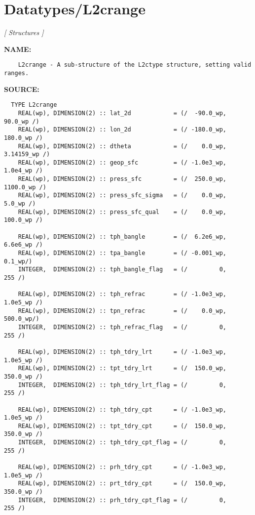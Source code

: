 \section{Datatypes/L2crange}
\textsl{[ Structures ]}

\label{ch:robo44}
\label{ch:Datatypes_L2crange}
\textbf{NAME:}\hspace{0.08in}\begin{Verbatim}
    L2crange - A sub-structure of the L2ctype structure, setting valid ranges.
\end{Verbatim}
\textbf{SOURCE:}\hspace{0.08in}\begin{Verbatim}
  TYPE L2crange
    REAL(wp), DIMENSION(2) :: lat_2d            = (/  -90.0_wp,     90.0_wp /)
    REAL(wp), DIMENSION(2) :: lon_2d            = (/ -180.0_wp,    180.0_wp /)
    REAL(wp), DIMENSION(2) :: dtheta            = (/    0.0_wp,  3.14159_wp /)
    REAL(wp), DIMENSION(2) :: geop_sfc          = (/ -1.0e3_wp,    1.0e4_wp /)
    REAL(wp), DIMENSION(2) :: press_sfc         = (/  250.0_wp,   1100.0_wp /)
    REAL(wp), DIMENSION(2) :: press_sfc_sigma   = (/    0.0_wp,      5.0_wp /)
    REAL(wp), DIMENSION(2) :: press_sfc_qual    = (/    0.0_wp,    100.0_wp /)

    REAL(wp), DIMENSION(2) :: tph_bangle        = (/  6.2e6_wp,  6.6e6_wp /)
    REAL(wp), DIMENSION(2) :: tpa_bangle        = (/ -0.001_wp,     0.1_wp/)
    INTEGER,  DIMENSION(2) :: tph_bangle_flag   = (/         0,       255 /)

    REAL(wp), DIMENSION(2) :: tph_refrac        = (/ -1.0e3_wp,  1.0e5_wp /)
    REAL(wp), DIMENSION(2) :: tpn_refrac        = (/    0.0_wp,   500.0_wp/)
    INTEGER,  DIMENSION(2) :: tph_refrac_flag   = (/         0,       255 /)

    REAL(wp), DIMENSION(2) :: tph_tdry_lrt      = (/ -1.0e3_wp,  1.0e5_wp /)
    REAL(wp), DIMENSION(2) :: tpt_tdry_lrt      = (/  150.0_wp,  350.0_wp /)
    INTEGER,  DIMENSION(2) :: tph_tdry_lrt_flag = (/         0,       255 /)

    REAL(wp), DIMENSION(2) :: tph_tdry_cpt      = (/ -1.0e3_wp,  1.0e5_wp /)
    REAL(wp), DIMENSION(2) :: tpt_tdry_cpt      = (/  150.0_wp,  350.0_wp /)
    INTEGER,  DIMENSION(2) :: tph_tdry_cpt_flag = (/         0,       255 /)

    REAL(wp), DIMENSION(2) :: prh_tdry_cpt      = (/ -1.0e3_wp,  1.0e5_wp /)
    REAL(wp), DIMENSION(2) :: prt_tdry_cpt      = (/  150.0_wp,  350.0_wp /)
    INTEGER,  DIMENSION(2) :: prh_tdry_cpt_flag = (/         0,       255 /)


\end{Verbatim}

